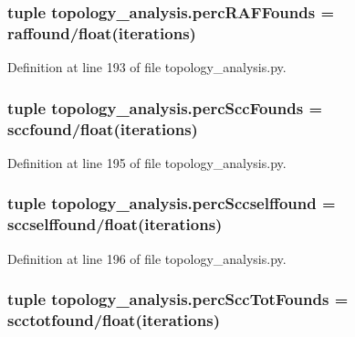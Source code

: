 \hypertarget{a00157_a51a66ce80f70aeab8bde70af9960e419}{
\subsubsection[{perc\-R\-A\-F\-Founds}]{\setlength{\rightskip}{0pt plus 5cm}tuple topology\-\_\-analysis.\-perc\-R\-A\-F\-Founds = {\bf raffound}/float({\bf iterations})}}\label{a00157_a51a66ce80f70aeab8bde70af9960e419}


Definition at line 193 of file topology\-\_\-analysis.\-py.

\hypertarget{a00157_a14f23c89de77042b80e78e1d9ab7b754}{
\subsubsection[{perc\-Scc\-Founds}]{\setlength{\rightskip}{0pt plus 5cm}tuple topology\-\_\-analysis.\-perc\-Scc\-Founds = {\bf sccfound}/float({\bf iterations})}}\label{a00157_a14f23c89de77042b80e78e1d9ab7b754}


Definition at line 195 of file topology\-\_\-analysis.\-py.

\hypertarget{a00157_a8bf55c62b8e7385526396a9003e343bb}{
\subsubsection[{perc\-Sccselffound}]{\setlength{\rightskip}{0pt plus 5cm}tuple topology\-\_\-analysis.\-perc\-Sccselffound = {\bf sccselffound}/float({\bf iterations})}}\label{a00157_a8bf55c62b8e7385526396a9003e343bb}


Definition at line 196 of file topology\-\_\-analysis.\-py.

\hypertarget{a00157_aee49954a6b9abb7c4bd677c17ed4013b}{
\subsubsection[{perc\-Scc\-Tot\-Founds}]{\setlength{\rightskip}{0pt plus 5cm}tuple topology\-\_\-analysis.\-perc\-Scc\-Tot\-Founds = {\bf scctotfound}/float({\bf iterations})}}\label{a00157_aee49954a6b9abb7c4bd677c17ed4013b}


